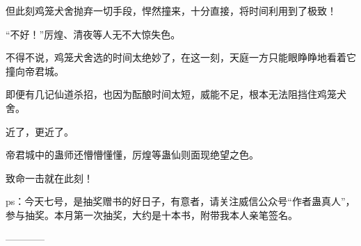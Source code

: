 \begin{this_body}
但此刻鸡笼犬舍抛弃一切手段，悍然撞来，十分直接，将时间利用到了极致！

“不好！”厉煌、清夜等人无不大惊失色。

不得不说，鸡笼犬舍选的时间太绝妙了，在这一刻，天庭一方只能眼睁睁地看着它撞向帝君城。

即便有几记仙道杀招，也因为酝酿时间太短，威能不足，根本无法阻挡住鸡笼犬舍。

近了，更近了。

帝君城中的蛊师还懵懵懂懂，厉煌等蛊仙则面现绝望之色。

致命一击就在此刻！

ps：今天七号，是抽奖赠书的好日子，有意者，请关注威信公众号“作者蛊真人”，参与抽奖。本月第一次抽奖，大约是十本书，附带我本人亲笔签名。

------------

\end{this_body}

